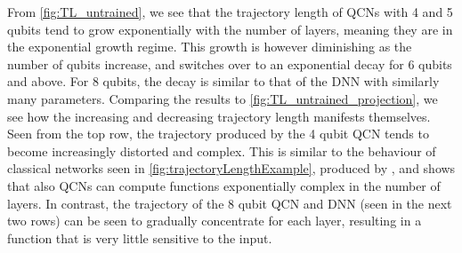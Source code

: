 
From \cref{fig:TL_untrained}, we see that the trajectory length of QCNs with 4 and 5 qubits tend to grow exponentially with the number of layers, meaning they are in the exponential growth regime. This growth is however diminishing as the number of qubits increase, and switches over to an exponential decay for 6 qubits and above. For 8 qubits, the decay is similar to that of the DNN with similarly many parameters. Comparing the results to \cref{fig:TL_untrained_projection}, we see how the increasing and decreasing trajectory length manifests themselves. Seen from the top row, the trajectory produced by the 4 qubit QCN tends to become increasingly distorted and complex. This is similar to the behaviour of classical networks seen in \cref{fig:trajectoryLengthExample}, produced by \citet{raghu2017expressive}, and shows that also QCNs can compute functions exponentially complex in the number of layers. In contrast, the trajectory of the 8 qubit QCN and DNN (seen in the next two rows) can be seen to gradually concentrate for each layer, resulting in a function that is very little sensitive to the input.  


